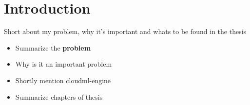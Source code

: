 \section{Introduction}

Short about my problem, why it's important and whats to be found in the thesis 

\begin{itemize}
  \item Summarize the \textbf{problem}
  \item Why is it an important problem
  \item Shortly mention cloudml-engine
  \item Summarize chapters of thesis
\end{itemize}
